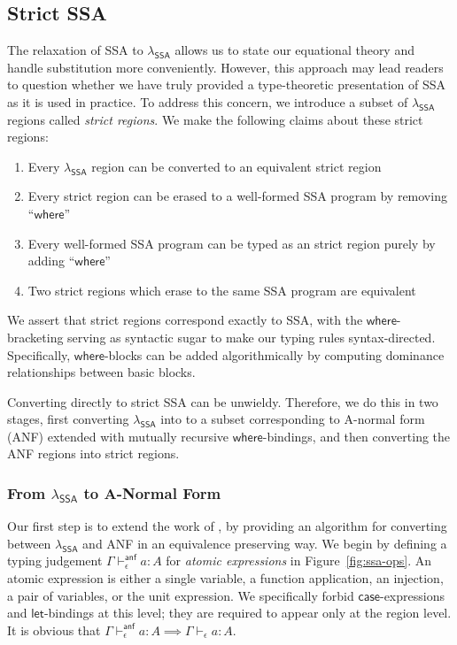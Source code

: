 \documentclass[acmsmall,screen,review]{acmart}
\newcommand{\ms}[1]{\ensuremath{\mathsf{#1}}}
\newcommand{\hasty}[4]{#1 \vdash_{#2} #3: {#4}}
\newcommand{\ahasty}[4]{#1 \vdash_{#2}^{\ms{anf}} #3 : {#4}}
\newcommand{\isotopessa}{\(\lambda_{\ms{SSA}}\)}
\begin{document}
\subsection{Strict SSA}

\label{ssec:ssa-normal}

The relaxation of SSA to \isotopessa{} allows us to state our equational theory and handle
substitution more conveniently. However, this approach may lead readers to question whether we have
truly provided a type-theoretic presentation of SSA as it is used in practice. To address this
concern, we introduce a subset of \isotopessa{} regions called \emph{strict regions}. We make the
following claims about these strict regions:
\begin{enumerate}
  \item Every \isotopessa{} region can be converted to an equivalent strict region 
  \label{claim:ssa-conv}
  \item Every strict region can be erased to a well-formed SSA program by removing
  ``\ms{where}'' \label{claim:ssa-erase}
  \item Every well-formed SSA program can be typed as an strict region purely by adding
  ``\ms{where}'' \label{claim:ssa-wf}
  \item Two strict regions which erase to the same SSA program are equivalent
  \label{claim:ssa-inj}
\end{enumerate}
We assert that strict regions correspond exactly to SSA, with the \ms{where}-bracketing serving as
syntactic sugar to make our typing rules syntax-directed. Specifically, \ms{where}-blocks can be
added algorithmically by computing dominance relationships between basic blocks.

Converting directly to strict SSA can be unwieldy. Therefore, we do
this in two stages, first converting \isotopessa{} into to a subset
corresponding to A-normal form (ANF) extended with mutually recursive
\ms{where}-bindings, and then converting the ANF regions into strict
regions.

\subsubsection{From \isotopessa{} to A-Normal Form}

Our first step is to extend the work of \citet{chakravarty-functional-ssa-2003}, by providing an
algorithm for converting between \isotopessa{} and ANF in an equivalence preserving way. We begin by
defining a typing judgement $\ahasty{\Gamma}{\epsilon}{a}{A}$ for \emph{atomic expressions} in
Figure~\ref{fig:ssa-ops}. An atomic expression is either a single variable, a function application,
an injection, a pair of variables, or the unit expression. We specifically forbid
\ms{case}-expressions and \ms{let}-bindings at this level; they are required to appear only at the
region level. It is obvious that $\ahasty{\Gamma}{\epsilon}{a}{A} \implies
\hasty{\Gamma}{\epsilon}{a}{A}$. 
\end{document}

